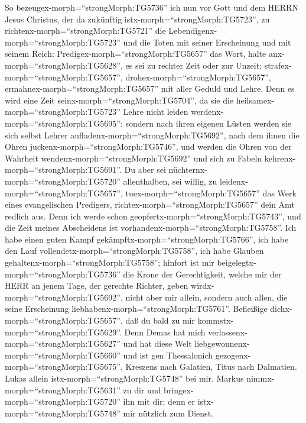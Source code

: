  So bezeugex-morph=``strongMorph:TG5736'' ich nun vor Gott
und dem HERRN Jesus Christus, der da zukünftig
istx-morph=``strongMorph:TG5723'', zu
richtenx-morph=``strongMorph:TG5721'' die
Lebendigenx-morph=``strongMorph:TG5723'' und die Toten mit seiner
Erscheinung und mit seinem Reich: 
Predigex-morph=``strongMorph:TG5657'' das Wort, halte
anx-morph=``strongMorph:TG5628'', es sei zu rechter Zeit oder zur
Unzeit; strafex-morph=``strongMorph:TG5657'',
drohex-morph=``strongMorph:TG5657'',
ermahnex-morph=``strongMorph:TG5657'' mit aller Geduld und Lehre.
 Denn es wird eine Zeit seinx-morph=``strongMorph:TG5704'',
da sie die heilsamex-morph=``strongMorph:TG5723'' Lehre nicht leiden
werdenx-morph=``strongMorph:TG5695''; sondern nach ihren eigenen Lüsten
werden sie sich selbst Lehrer aufladenx-morph=``strongMorph:TG5692'',
nach dem ihnen die Ohren juckenx-morph=``strongMorph:TG5746'',
 und werden die Ohren von der Wahrheit
wendenx-morph=``strongMorph:TG5692'' und sich zu Fabeln
kehrenx-morph=``strongMorph:TG5691''.  Du aber sei
nüchternx-morph=``strongMorph:TG5720'' allenthalben, sei willig, zu
leidenx-morph=``strongMorph:TG5657'', tuex-morph=``strongMorph:TG5657''
das Werk eines evangelischen Predigers,
richtex-morph=``strongMorph:TG5657'' dein Amt redlich aus. 
Denn ich werde schon geopfertx-morph=``strongMorph:TG5743'', und die
Zeit meines Abscheidens ist vorhandenx-morph=``strongMorph:TG5758''.
 Ich habe einen guten Kampf
gekämpftx-morph=``strongMorph:TG5766'', ich habe den Lauf
vollendetx-morph=``strongMorph:TG5758'', ich habe Glauben
gehaltenx-morph=``strongMorph:TG5758'';  hinfort ist mir
beigelegtx-morph=``strongMorph:TG5736'' die Krone der Gerechtigkeit,
welche mir der HERR an jenem Tage, der gerechte Richter, geben
wirdx-morph=``strongMorph:TG5692'', nicht aber mir allein, sondern auch
allen, die seine Erscheinung liebhabenx-morph=``strongMorph:TG5761''.
 Befleißige dichx-morph=``strongMorph:TG5657'', daß du bald
zu mir kommstx-morph=``strongMorph:TG5629''.  Denn Demas
hat mich verlassenx-morph=``strongMorph:TG5627'' und hat diese Welt
liebgewonnenx-morph=``strongMorph:TG5660'' und ist gen Thessalonich
gezogenx-morph=``strongMorph:TG5675'', Kreszens nach Galatien, Titus
nach Dalmatien.  Lukas allein
istx-morph=``strongMorph:TG5748'' bei mir. Markus
nimmx-morph=``strongMorph:TG5631'' zu dir und
bringex-morph=``strongMorph:TG5720'' ihn mit dir; denn er
istx-morph=``strongMorph:TG5748'' mir nützlich zum Dienst. 
